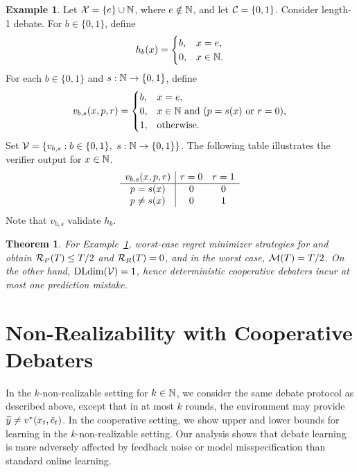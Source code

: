 \documentclass[11pt,letterpaper]{article}
\newtheorem{theorem}{Theorem}
\theoremstyle{definition}
\newtheorem{example}{Example}
\theoremstyle{plain}
\begin{document}
\begin{example}\label{ex:reggap}
Let ${\mathcal X}=\{e\}\cup\mathbb{N}$, where $e\notin\mathbb{N}$, and let
${{\mathcal C}}=\{0,1\}$. Consider length-1 debate. For $b\in\{0,1\}$, define
\[
h_b(x)=
\begin{cases}
b,&x=e,\\
0,&x\in\mathbb{N}.
\end{cases}
\]
For each $b\in\{0,1\}$ and $s:\mathbb{N}\to\{0,1\}$, define
\[
v_{b,s}(x,p,r)=
\begin{cases}
b,&x=e,\\
0,&x\in\mathbb{N}\text{ and }(p=s(x)\text{ or }r=0),\\
1,&\text{otherwise}.
\end{cases}
\]
Set $\V=\{v_{b,s}:b\in\{0,1\},\ s:\naturals\to\{0,1\}\}$.
The following table illustrates the verifier output for $x \in \mathbb{N}$.
\[
\begin{array}{c|cc}
v_{b,s}(x,{p},{r}) &{r}=0&{r}=1\\\hline
{p}=s(x)&0&0\\
{p} \ne s(x)&0&1
\end{array}
\]
Note that $v_{b,s}$ validate $h_b$.
\end{example}

\begin{theorem}\label{thm:reggap}
For Example~\ref{ex:reggap}, worst-case regret minimizer strategies for \df and \dt obtain ${{\mathcal R}_P}(T) \leq T/2$ and ${{\mathcal R}_R}(T) = 0$, and in the worst case, ${\mathcal M}(T) = T/2$.
On the other hand, $\mathrm{DLdim}({\mathcal V}) = 1$, hence deterministic cooperative debaters incur at most one prediction mistake. 
\end{theorem}













\section{Non-Realizability with Cooperative Debaters}

In the $k$-non-realizable setting for $k \in \mathbb{N}$, we consider the same debate protocol as described above, except that in at most $k$ rounds, the environment may provide ${\widetilde{y}} \neq v^*(x_t, \bar{c}_t)$. In the cooperative setting, we show upper and lower bounds for learning in the $k$-non-realizable setting. Our analysis shows that debate learning is more adversely affected by feedback noise or model misspecification than standard online learning.
\end{document}

